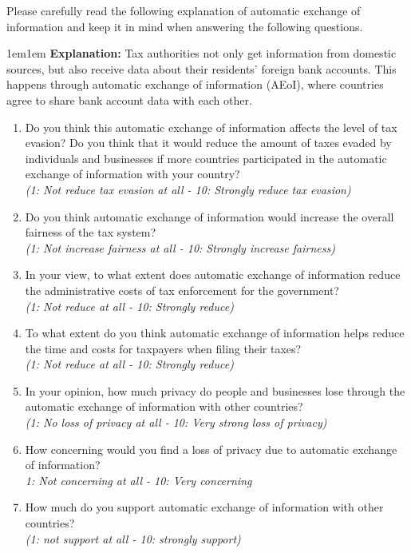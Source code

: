 \documentclass[11pt]{article}
\begin{document}
Please carefully read the following explanation of automatic exchange of information and keep it in mind when answering the following questions.\\ 
\begin{adjustwidth}{1em}{1em} \textbf{Explanation:} Tax authorities not only get information from domestic sources, but also receive data about their residents’ foreign bank accounts. This happens through automatic exchange of information (AEoI), where countries agree to share bank account data with each other.  
\end{adjustwidth}

\begin{enumerate}[resume]
    \item Do you think this automatic exchange of information affects the level of tax evasion? Do you think that it would reduce the amount of taxes evaded by individuals and businesses if more countries participated in the automatic exchange of information with your country?\\
    \textit{(1: Not reduce tax evasion at all - 10: Strongly reduce tax evasion)} 
    \item Do you think automatic exchange of information would increase the overall fairness of the tax system? \\
    \textit{(1: Not increase fairness at all - 10: Strongly increase fairness)} 
    \item In your view, to what extent does automatic exchange of information reduce the administrative costs of tax enforcement for the government?\\
\textit{(1: Not reduce at all - 10: Strongly reduce)}
    \item To what extent do you think automatic exchange of information helps reduce the time and costs for taxpayers when filing their taxes?\\
\textit{(1: Not reduce at all - 10: Strongly reduce)}
    \item In your opinion, how much privacy do people and businesses lose through the automatic exchange of information  with other countries? \\
    \textit{(1: No loss of privacy at all - 10: Very strong loss of privacy)} 
    \item How concerning would you find a loss of privacy due to automatic exchange of information? \\ 
    \textit{1: Not concerning at all - 10: Very concerning}
    \item How much do you support automatic exchange of information with other countries? \\
    \textit{(1: not support at all - 10: strongly support)}
\end{enumerate}
\end{document}
